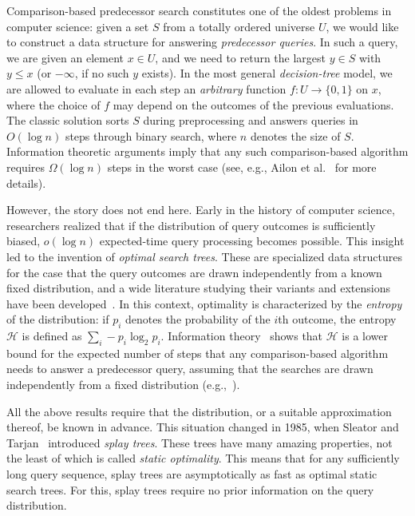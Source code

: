 \documentclass[11pt]{article}
\newcommand{\etal}{et al.}
\begin{document}
Comparison-based predecessor search constitutes one of the oldest problems
in computer science: given a set $S$ from a totally ordered universe
$U$, we would like to construct a data structure for answering 
\emph{predecessor queries}. 
In such a query, we are given an element $x \in U$, and we need to return 
the largest $y \in S$ with $y \leq x$ (or $-\infty$, if no
such $y$ exists). In the most general \emph{decision-tree} model, 
we are allowed to evaluate 
in each step an \emph{arbitrary} function $f: U \rightarrow \{0,1\}$ on $x$,
where the choice of $f$ may depend on the outcomes of the previous evaluations.
The classic solution sorts $S$ during preprocessing and
answers queries in $O(\log n)$ steps through binary search, where
$n$ denotes the size of $S$.
Information theoretic arguments imply that any such comparison-based algorithm 
requires $\Omega(\log n)$
steps in the worst case (see, e.g., Ailon \etal~\cite[Section~2]{AilonChClLiMuSe11}
for more details).


However, the story does not end here. Early in the history of computer 
science, researchers realized that if the distribution of query outcomes
is sufficiently biased,  $o(\log n)$ expected-time query processing 
becomes possible. 
This insight led to the invention of \emph{optimal search trees}.
These are specialized data structures for the case
that the query outcomes are drawn independently from a known
fixed distribution, and a wide literature studying their variants 
and extensions have been
developed~\cite{optimum1,optimum2,optimum3,optimum4,optimum5,optimum6, optimum7,
optimum8, optimum9, optimum10, optimum11, optimum12, optimum13, optimum14,
optimum15}.  In this context, optimality is characterized by the \emph{entropy} 
of the distribution: if $p_i$ denotes the probability of the $i$th outcome, 
the entropy $\mathcal{H}$ is defined as 
$\sum_i -p_i \log_2 p_i$. Information theory~\cite{weaver} 
shows that $\mathcal{H}$  
is a lower bound for the expected number of steps that any 
comparison-based algorithm needs to answer a predecessor query,
assuming that the searches are drawn independently from a 
fixed distribution (e.g.,~\cite[Claim~2.2]{AilonChClLiMuSe11}).

All the above results require that the distribution, or a suitable
approximation thereof, be known in advance. This situation changed in 
1985, when Sleator and Tarjan~\cite{splay} introduced \emph{splay trees}. 
These trees have
many amazing properties, not the least of which is 
called \emph{static optimality}. This means that for any
sufficiently long query sequence, splay trees are
asymptotically as fast as optimal static search trees. For this, splay trees 
require no prior information on the query distribution.
\end{document}
